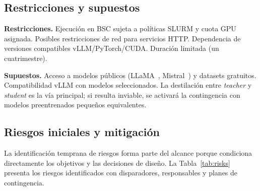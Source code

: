 \subsection{Restricciones y supuestos}

\textbf{Restricciones.} Ejecución en BSC sujeta a políticas SLURM y cuota GPU asignada. Posibles restricciones de red para servicios HTTP. Dependencia de versiones compatibles vLLM/PyTorch/CUDA. Duración limitada (un cuatrimestre).

\textbf{Supuestos.} Acceso a modelos públicos (LLaMA~\cite{touvron2023llama}, Mistral~\cite{jiang2023mistral}) y datasets gratuitos. Compatibilidad vLLM con modelos seleccionados. La destilación entre \textit{teacher} y \textit{student} es la vía principal; si resulta inviable, se activará la contingencia con modelos preentrenados pequeños equivalentes.

\subsection{Riesgos iniciales y mitigación}

La identificación temprana de riesgos forma parte del alcance porque condiciona directamente los objetivos y las decisiones de diseño. La Tabla~\ref{tab:risks} presenta los riesgos identificados con disparadores, responsables y planes de contingencia.

